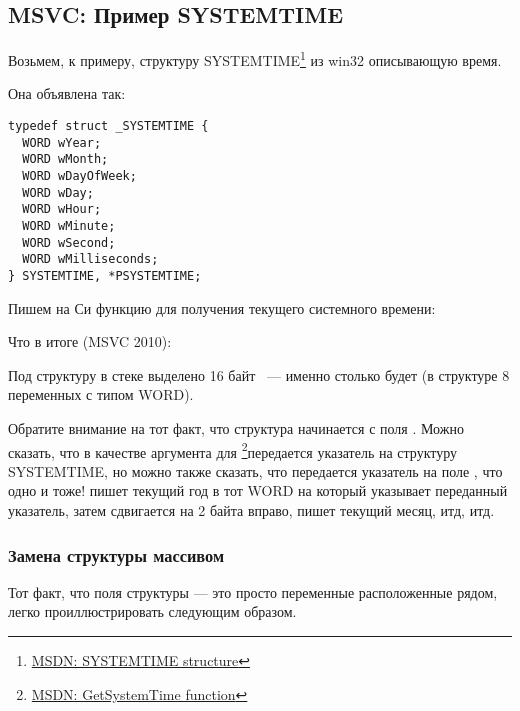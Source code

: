 \subsection{MSVC: Пример SYSTEMTIME}
\label{sec:SYSTEMTIME}

\newcommand{\FNSYSTEMTIME}{\footnote{\href{http://go.yurichev.com/17260}{MSDN: SYSTEMTIME structure}}}

Возьмем, к примеру, структуру SYSTEMTIME\FNSYSTEMTIME{} из win32 описывающую время.

Она объявлена так:

\begin{lstlisting}[caption=WinBase.h]
typedef struct _SYSTEMTIME {
  WORD wYear;
  WORD wMonth;
  WORD wDayOfWeek;
  WORD wDay;
  WORD wHour;
  WORD wMinute;
  WORD wSecond;
  WORD wMilliseconds;
} SYSTEMTIME, *PSYSTEMTIME;
\end{lstlisting}

Пишем на Си функцию для получения текущего системного времени:



Что в итоге (MSVC 2010):



Под структуру в стеке выделено 16 байт ~--- именно столько будет 
(в структуре 8 переменных с типом WORD).

\newcommand{\FNMSDNGST}{\footnote{\href{http://go.yurichev.com/17261}{MSDN: GetSystemTime function}}}

Обратите внимание на тот факт, что структура начинается с поля . 
Можно сказать, что в качестве аргумента для \FNMSDNGST передается указатель на структуру 
SYSTEMTIME, но можно также сказать, что передается указатель на поле , 
что одно и тоже! 
 пишет текущий год в тот WORD на который указывает переданный указатель, 
затем сдвигается на 2 байта вправо, пишет текущий месяц, итд, итд.



\subsubsection{Замена структуры массивом}

Тот факт, что поля структуры --- это просто переменные расположенные рядом, легко проиллюстрировать следующим образом.%

